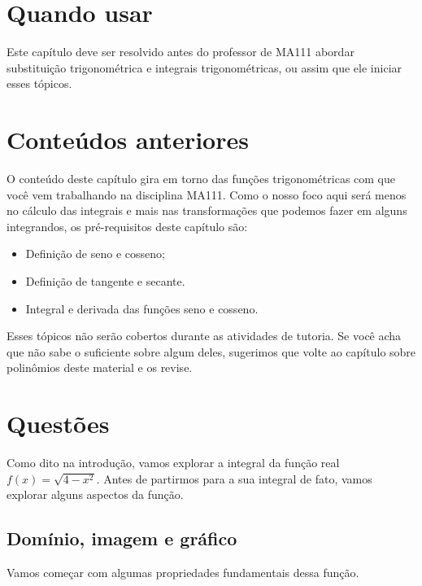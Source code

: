 \documentclass[main_estudante.tex]{subfiles}
\begin{document}
\paraAmbos

\section{Quando usar}

Este capítulo deve ser resolvido antes do professor de MA111 abordar substituição trigonométrica e integrais trigonométricas, ou assim que ele iniciar esses tópicos.

\section{Conteúdos anteriores}

O conteúdo deste capítulo gira em torno das funções trigonométricas com que você vem trabalhando na disciplina MA111. Como o nosso foco aqui será menos no cálculo das integrais e mais nas transformações que podemos fazer em alguns integrandos, os pré-requisitos deste capítulo são:
\begin{itemize}
 \item Definição de seno e cosseno;
 \item Definição de tangente e secante.
 \item Integral e derivada das funções seno e cosseno.
\end{itemize}

Esses tópicos não serão cobertos durante as atividades de tutoria. Se você acha que não sabe o suficiente sobre algum deles, sugerimos que volte ao capítulo sobre polinômios deste material e os revise.

\newpage

\section{Questões}

Como dito na introdução, vamos explorar a integral da função real $f(x)=\sqrt{4-x^2}$. Antes de partirmos para a sua integral de fato, vamos explorar alguns aspectos da função.

\subsection*{Domínio, imagem e gráfico}

Vamos começar com algumas propriedades fundamentais dessa função.

\end{document}
